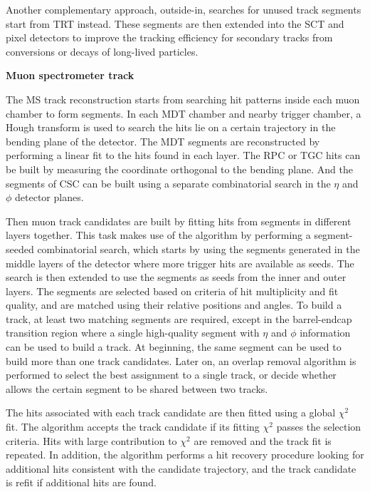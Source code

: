 Another complementary approach, outside-in, searches for unused track segments start from TRT instead.
These segments are then extended into the SCT and pixel detectors to improve the tracking efficiency for secondary tracks from conversions or decays of long-lived particles.

\textbf{Muon spectrometer track}

The MS track reconstruction\cite{Aad:2016jkr} starts from searching hit patterns inside each muon chamber to form segments.
In each MDT chamber and nearby trigger chamber, a Hough transform\cite{ILLINGWORTH198887} is used to search the hits lie on a certain trajectory in the bending plane of the detector.
The MDT segments are reconstructed by performing a linear fit to the hits found in each layer.
The RPC or TGC hits can be built by measuring the coordinate orthogonal to the bending plane.
And the segments of CSC can be built using a separate combinatorial search in the $\eta$ and $\phi$ detector planes.

Then muon track candidates are built by fitting hits from segments in different layers together.
This task makes use of the algorithm by performing a segment-seeded combinatorial search, which starts by using the segments generated in the middle layers of the detector where more trigger hits are available as seeds.
The search is then extended to use the segments as seeds from the inner and outer layers.
The segments are selected based on criteria of hit multiplicity and fit quality, and are matched using their relative positions and angles.
To build a track, at least two matching segments are required, except in the barrel-endcap transition region where a single high-quality segment with $\eta$ and $\phi$ information can be used to build a track.
At beginning, the same segment can be used to build more than one track candidates.
Later on, an overlap removal algorithm is performed to select the best assignment to a single track, or decide whether allows the certain segment to be shared between two tracks.

The hits associated with each track candidate are then fitted using a global $\chi^{2}$ fit.
The algorithm accepts the track candidate if its fitting $\chi^{2}$ passes the selection criteria.
Hits with large contribution to $\chi^{2}$ are removed and the track fit is repeated.
In addition, the algorithm performs a hit recovery procedure looking for additional hits consistent with the candidate trajectory, and the track candidate is refit if additional hits are found.
